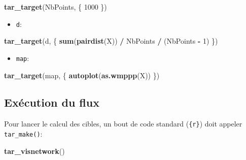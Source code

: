 \documentclass[
  12pt,
  french,
  a4paper,
  extrafontsizes,onecolumn,openright
  ]{memoir}
\newenvironment{Shaded}{\begin{snugshade}}{\end{snugshade}}
\newcommand{\DecValTok}[1]{\textcolor[rgb]{0.00,0.00,0.81}{#1}}
\newcommand{\FunctionTok}[1]{\textcolor[rgb]{0.13,0.29,0.53}{\textbf{#1}}}
\newcommand{\NormalTok}[1]{#1}
\newcommand{\SpecialCharTok}[1]{\textcolor[rgb]{0.81,0.36,0.00}{\textbf{#1}}}
\providecommand{\tightlist}{%
  \setlength{\itemsep}{0pt}\setlength{\parskip}{0pt}}
\begin{document}
\scriptsize

\begin{Shaded}
\begin{Highlighting}[]
\FunctionTok{tar\_target}\NormalTok{(NbPoints, \{}
    \DecValTok{1000}
\NormalTok{\})}
\end{Highlighting}
\end{Shaded}

\normalsize

\begin{itemize}
\tightlist
\item
  \texttt{d}:
\end{itemize}

\scriptsize

\begin{Shaded}
\begin{Highlighting}[]
\FunctionTok{tar\_target}\NormalTok{(d, \{}
    \FunctionTok{sum}\NormalTok{(}\FunctionTok{pairdist}\NormalTok{(X)) }\SpecialCharTok{/}\NormalTok{ NbPoints }\SpecialCharTok{/}\NormalTok{ (NbPoints }\SpecialCharTok{{-}} \DecValTok{1}\NormalTok{)}
\NormalTok{\})}
\end{Highlighting}
\end{Shaded}

\normalsize

\begin{itemize}
\tightlist
\item
  \texttt{map}:
\end{itemize}

\scriptsize

\begin{Shaded}
\begin{Highlighting}[]
\FunctionTok{tar\_target}\NormalTok{(map, \{}
    \FunctionTok{autoplot}\NormalTok{(}\FunctionTok{as.wmppp}\NormalTok{(X))}
\NormalTok{\})}
\end{Highlighting}
\end{Shaded}

\normalsize

\subsection{Exécution du flux}\label{exuxe9cution-du-flux}

Pour lancer le calcul des cibles, un bout de code standard (\texttt{\{r\}}) doit appeler \texttt{tar\_make()}:

\scriptsize

\begin{Shaded}
\begin{Highlighting}[]
\FunctionTok{tar\_visnetwork}\NormalTok{()}
\end{Highlighting}
\end{Shaded}
\end{document}
